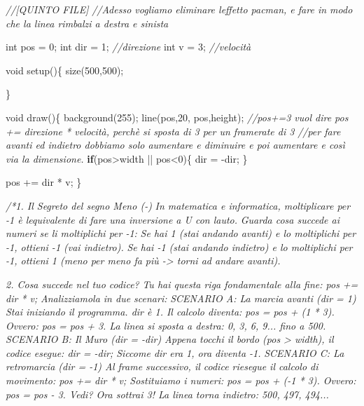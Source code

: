\documentclass[
]{article}
\newenvironment{Shaded}{}{}
\newcommand{\CommentTok}[1]{\textcolor[rgb]{0.38,0.63,0.69}{\textit{#1}}}
\newcommand{\ControlFlowTok}[1]{\textcolor[rgb]{0.00,0.44,0.13}{\textbf{#1}}}
\newcommand{\DataTypeTok}[1]{\textcolor[rgb]{0.56,0.13,0.00}{#1}}
\newcommand{\DecValTok}[1]{\textcolor[rgb]{0.25,0.63,0.44}{#1}}
\newcommand{\FunctionTok}[1]{\textcolor[rgb]{0.02,0.16,0.49}{#1}}
\newcommand{\NormalTok}[1]{#1}
\newcommand{\OperatorTok}[1]{\textcolor[rgb]{0.40,0.40,0.40}{#1}}
\begin{document}
\begin{Shaded}
\begin{Highlighting}[]
\CommentTok{//[QUINTO FILE]}
\CommentTok{//Adesso vogliamo eliminare l\textquotesingle{}effetto pacman, e fare in modo che la linea rimbalzi a destra e sinista}

\DataTypeTok{int}\NormalTok{ pos }\OperatorTok{=} \DecValTok{0}\OperatorTok{;}
\DataTypeTok{int}\NormalTok{ dir }\OperatorTok{=} \DecValTok{1}\OperatorTok{;} \CommentTok{//direzione}
\DataTypeTok{int}\NormalTok{ v }\OperatorTok{=} \DecValTok{3}\OperatorTok{;} \CommentTok{//velocità}

\DataTypeTok{void} \FunctionTok{setup}\OperatorTok{()\{}
  \FunctionTok{size}\OperatorTok{(}\DecValTok{500}\OperatorTok{,}\DecValTok{500}\OperatorTok{);}

\OperatorTok{\}}

\DataTypeTok{void} \FunctionTok{draw}\OperatorTok{()\{}
  \FunctionTok{background}\OperatorTok{(}\DecValTok{255}\OperatorTok{);}
  \FunctionTok{line}\OperatorTok{(}\NormalTok{pos}\OperatorTok{,}\DecValTok{20}\OperatorTok{,}\NormalTok{ pos}\OperatorTok{,}\NormalTok{height}\OperatorTok{);}
  \CommentTok{//pos+=3 vuol dire pos += direzione * velocità, perchè si sposta di 3 per un framerate di 3}
  \CommentTok{//per fare avanti ed indietro dobbiamo solo aumentare e diminuire e poi aumentare e così via la dimensione.}
   \ControlFlowTok{if}\OperatorTok{(}\NormalTok{pos}\OperatorTok{\textgreater{}}\NormalTok{width }\OperatorTok{||}\NormalTok{ pos}\OperatorTok{\textless{}}\DecValTok{0}\OperatorTok{)\{}
\NormalTok{   dir }\OperatorTok{=} \OperatorTok{{-}}\NormalTok{dir}\OperatorTok{;}
   \OperatorTok{\}}

\NormalTok{   pos }\OperatorTok{+=}\NormalTok{ dir }\OperatorTok{*}\NormalTok{ v}\OperatorTok{;}
\OperatorTok{\}}


\CommentTok{/*1. Il Segreto del segno Meno ({-})}
\CommentTok{In matematica e informatica, moltiplicare per {-}1 è l\textquotesingle{}equivalente di fare una inversione a U con l\textquotesingle{}auto.}
\CommentTok{Guarda cosa succede ai numeri se li moltiplichi per {-}1:}
\CommentTok{Se hai 1 (stai andando avanti) e lo moltiplichi per {-}1, ottieni {-}1 (vai indietro).}
\CommentTok{Se hai {-}1 (stai andando indietro) e lo moltiplichi per {-}1, ottieni 1 (meno per meno fa più {-}\textgreater{} torni ad andare avanti).}

\CommentTok{2. Cosa succede nel tuo codice?}
\CommentTok{Tu hai questa riga fondamentale alla fine: pos += dir * v;}
\CommentTok{Analizziamola in due scenari:}
\CommentTok{SCENARIO A: La marcia avanti (dir = 1) Stai iniziando il programma. dir è 1. Il calcolo diventa: pos = pos + (1 * 3). Ovvero: pos = pos + 3. La linea si sposta a destra: 0, 3, 6, 9... fino a 500.}
\CommentTok{SCENARIO B: Il Muro (dir = {-}dir) Appena tocchi il bordo (pos \textgreater{} width), il codice esegue: dir = {-}dir; Siccome dir era 1, ora diventa {-}1.}
\CommentTok{SCENARIO C: La retromarcia (dir = {-}1) Al frame successivo, il codice riesegue il calcolo di movimento: pos += dir * v; Sostituiamo i numeri: pos = pos + ({-}1 * 3). Ovvero: pos = pos {-} 3. Vedi? Ora sottrai 3! La linea torna indietro: 500, 497, 494...}


\end{Highlighting}
\end{Shaded}
\end{document}
